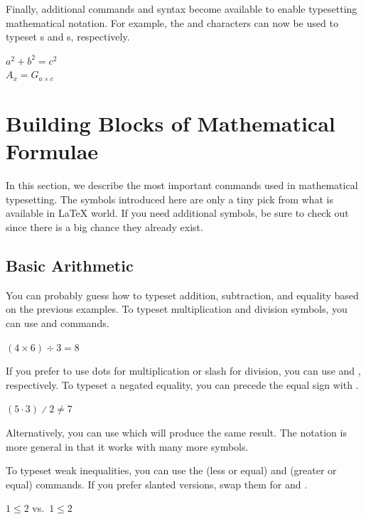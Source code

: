 Finally, additional commands and syntax become available to enable typesetting
mathematical notation. For example, the \ai{\^{}} and \ai{\_} characters can
now be used to typeset s and s, respectively.
\begin{example}
\( a^2 + b^2 = c^2 \) \\
\( A_x = G_{a\times c} \)
\end{example}

\section{Building Blocks of Mathematical Formulae}

In this section, we describe the most important commands used in mathematical
typesetting. The symbols introduced here are only a tiny pick from what is
available in \LaTeX{} world. If
you need additional symbols, be sure to check out~\cite{detexify,
  unicode-math-symbols, latexcomp} since there is a big chance they already
exist.

\subsection{Basic Arithmetic}

You can probably guess how to typeset addition, subtraction, and equality based
on the previous examples. To typeset multiplication and division symbols, you
can use  and  commands.
\begin{example}
\( (4 \times 6) \div 3 = 8 \)
\end{example}
If you prefer to use dots for multiplication or slash for division, you can use
 and , respectively. To typeset a negated equality, you
can precede the equal sign with .
\begin{example}
\( (5 \cdot 3) \divslash 2
  \not= 7 \)
\end{example}
Alternatively, you can use  which will produce the same result. The
 notation is more general in that it works with many more symbols.

To typeset weak inequalities, you can use the  (less or equal) and
 (greater or equal) commands. If you prefer slanted versions, swap them
for  and .
\begin{example}
\( 1 \leq 2 \) vs.\
\(1 \leqslant 2\)
\end{example}

